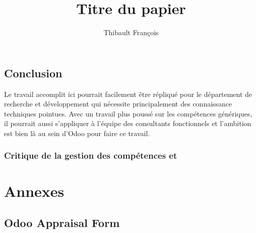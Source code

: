 \documentclass[a4paper,10pt]{report}
\begin{document}
\title  {Titre du papier}
\author  {Thibault François }
\maketitle
\tableofcontents  %

 
 


 

\chapter{Conclusion}
Le travail accomplit ici pourrait facilement être répliqué pour le département de recherche et développement qui nécessite principalement des connaissance techniques pointues. Avec un travail plus poussé sur les compétences génériques, il pourrait aussi s'appliquer à l'équipe des consultants fonctionnels et l'ambition est bien là au sein d'Odoo pour faire ce travail. 
\section{Critique de la gestion des compétences et }








\label{Bibliographie}
\lhead{\nouppercase{\leftmark}}
 



\part*{Annexes}
\lhead{\nouppercase{\leftmark}}
\appendix %

\chapter{Odoo Appraisal Form}



\end{document}
